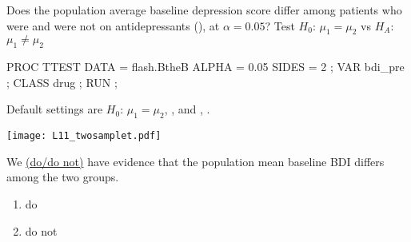 \begin{frame}[fragile]
Does the population average baseline depression score differ among patients who were and were not on antidepressants (), at $\alpha=0.05$?  Test $H_0$: $\mu_1=\mu_2$ vs  $H_A$:  $\mu_1 \neq \mu_2$ \\
\vskip10pt
\footnotesize
\begin{code}{.0}
PROC TTEST DATA = flash.BtheB ALPHA = 0.05 SIDES = 2 ;
   VAR bdi_pre ;
   CLASS drug ;
RUN ;
\end{code}
\emp
\vskip10pt
Default settings are $H_0$: $\mu_1=\mu_2$, , and , .
\end{frame}


\begin{frame}[fragile]
\texttt{[image: L11\_twosamplet.pdf]}
\emp
{} \hspace{1in} \emp
{}
\begin{clicker}{We \underline{(do/do not)} have evidence that the population mean baseline BDI differs among the two groups.}
\begin{enumerate}
\item do
\item do not
\end{enumerate}
\end{clicker}
\emp
\end{frame}
%
%


